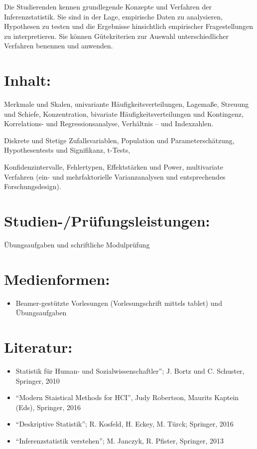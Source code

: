 Die Studierenden kennen grundlegende Konzepte und Verfahren der
Inferenzstatistik. Sie sind in der Lage, empirische Daten zu
analysieren, Hypothesen zu testen und die Ergebnisse hinsichtlich
empirischer Fragestellungen zu interpretieren. Sie können Gütekriterien
zur Auswahl unterschiedlicher Verfahren benennen und anwenden.

\section*{Inhalt:}\label{inhalt-6}

Merkmale und Skalen, univariante Häufigkeitsverteilungen, Lagemaße,
Streuung und Schiefe, Konzentration, bivariate Häufigkeitsverteilungen
und Kontingenz, Korrelations- und Regressionsanalyse, Verhältnis -- und
Indexzahlen.

Diskrete und Stetige Zufallsvariablen, Population und
Parameterschätzung, Hypothesentests und Signifikanz, t-Tests,

Konfidenzintervalle, Fehlertypen, Effektstärken und Power, multivariate
Verfahren (ein- und mehrfaktorielle Varianzanalysen und entsprechendes
Forschungsdesign).

\section*{Studien-/Prüfungsleistungen:}\label{studien-pruxfcfungsleistungen-6}

Übungsaufgaben und schriftliche Modulprüfung

\section*{Medienformen:}\label{medienformen-6}

\begin{itemize}
\tightlist
\item
  Beamer-gestützte Vorlesungen (Vorlesungschrift mittels tablet) und
  Übungsaufgaben
\end{itemize}

\section*{Literatur:}\label{literatur-6}

\begin{itemize}
\tightlist
\item
  Statistik für Human- und Sozialwissenschaftler''; J. Bortz und C.
  Schuster, Springer, 2010
\item
  ``Modern Staistical Methods for HCI'', Judy Robertson, Maurits Kaptein
  (Eds), Springer, 2016
\item
  ``Deskriptive Statistik''; R. Kosfeld, H. Eckey, M. Türck; Springer,
  2016
\item
  ``Inferenzstatistik verstehen''; M. Janczyk, R. Pfister, Springer,
  2013
\end{itemize}

